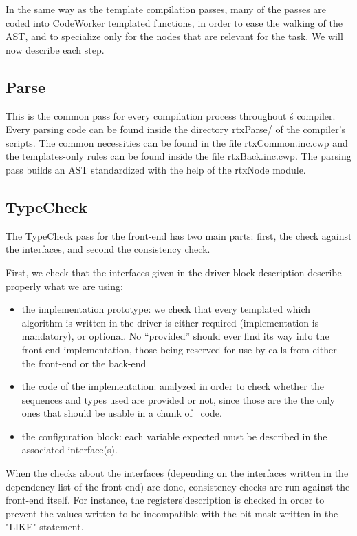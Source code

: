 \documentclass[american]{rtxreport}
\begin{document}
In the same way as the template compilation passes, many of the passes are
coded into CodeWorker templated functions, in order to ease the walking of
the AST, and to specialize only for the nodes that are relevant for the task.
We will now describe each step.

\subsection{Parse}

This is the common pass for every compilation process throughout \rtx\'s
compiler. Every parsing code can be found inside the directory rtxParse/ of the
compiler's scripts. The common necessities can be found in the file
rtxCommon.inc.cwp and the templates-only rules can be found inside the file
rtxBack.inc.cwp. The parsing pass builds an AST standardized with the help of
the rtxNode module.

\subsection{TypeCheck}

The TypeCheck pass for the front-end has two main parts: first, the check
against the interfaces, and second the consistency check.

First, we check that the interfaces given in the driver block description
describe properly what we are using:
\begin{itemize}
    \item the implementation prototype: we check that every templated which
        algorithm is written in the driver is either required (implementation
        is mandatory), or optional. No ``provided'' should ever find its way
        into the front-end implementation, those being reserved for use by
        calls from either the front-end or the back-end
    \item the code of the implementation: analyzed in order to check whether
        the sequences and types used are provided or not, since those are the
        the only ones that should be usable in a chunk of \rtx\ code.
    \item the configuration block: each variable expected must be described in the associated interface(s).
\end{itemize}

When the checks about the interfaces (depending on the interfaces written
in the dependency list of the front-end) are done, consistency checks are
run against the front-end itself. For instance, the registers'description
is checked in order to prevent the values written to be incompatible with the
bit mask written in the "LIKE" statement.
\end{document}
